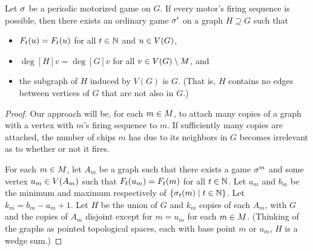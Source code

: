 \begin{thm} \label{natMotors}
Let $\s$ be a periodic motorized game on $G$. If every motor's firing sequence
is possible, then there exists an ordinary game $\s'$ on a graph $H \supseteq
G$ such that
\begin{itemize}
\item $\firing[\s']{u}{t} = \firing{u}{t}$ for all $t \in \nats$ and $u \in
  \V$,
\item $\deg[H]{v} = \deg[G]{v}$ for all $v \in \V \setminus \mots$, and
\item the subgraph of $H$ induced by $V(G)$ is $G$. (That is, $H$ contains no
  edges between vertices of $G$ that are not also in $G$.)
\end{itemize}
\end{thm}

\begin{proof}
Our approach will be, for each $m \in \mots$, to attach many copies of a graph
with a vertex with $m$'s firing sequence to $m$. If sufficiently many copies
are attached, the number of chips $m$ has due to its neighbors in $G$ becomes
irrelevant as to whether or not it fires.

For each $m \in \mots$, let $A_m$ be a graph such that there exists a game
$\s^m$ and some vertex $u _m\in \V[A_m]$ such that $\firing[\s^m]{u_m}{t} =
\firing{m}{t}$ for all $t \in \nats$. Let $a_m$ and $b_m$ be the minimum and
maximum respectively of $\set{\chips{m}{t}}{t \in \nats}$. Let $k_m = b_m - a_m
+ 1$. Let $H$ be the union of $G$ and $k_m$ copies of each $A_m$, with $G$ and
the copies of $A_m$ disjoint except for $m = u_m$ for each $m \in
\mots$. (Thinking of the graphs as pointed topological spaces, each with
base point $m$ or $u_m$, $H$ is a wedge sum.)


\end{proof}
